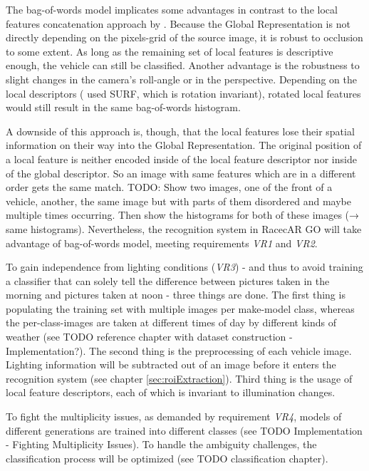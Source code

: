 The bag-of-words model implicates some advantages in contrast to the local features concatenation approach by \citeauthor{petrovic2004analysis}. Because the Global Representation is not directly depending on the pixels-grid of the source image, it is robust to occlusion to some extent. As long as the remaining set of local features is descriptive enough, the vehicle can still be classified. Another advantage is the robustness to slight changes in the camera's roll-angle or in the perspective. Depending on the local descriptors (\citeauthor{siddiqui2015robust} used SURF, which is rotation invariant), rotated local features would still result in the same bag-of-words histogram.

A downside of this approach is, though, that the local features lose their spatial information on their way into the Global Representation. The original position of a local feature is neither encoded inside of the local feature descriptor nor inside of the global descriptor. So an image with same features which are in a different order gets the same match. TODO: Show two images, one of the front of a vehicle, another, the same image but with parts of them disordered and maybe multiple times occurring. Then show the histograms for both of these images (→ same histograms). Nevertheless, the recognition system in RacecAR GO will take advantage of bag-of-words model, meeting requirements \emph{VR1} and \emph{VR2}.

To gain independence from lighting conditions (\emph{VR3}) - and thus to avoid training a classifier that can solely tell the difference between pictures taken in the morning and pictures taken at noon - three things are done. The first thing is populating the training set with multiple images per make-model class, whereas the per-class-images are taken at different times of day by different kinds of weather (see TODO reference chapter with dataset construction - Implementation?). The second thing is the preprocessing of each vehicle image. Lighting information will be subtracted out of an image before it enters the recognition system (see chapter \ref{sec:roiExtraction}). Third thing is the usage of local feature descriptors, each of which is invariant to illumination changes.

To fight the multiplicity issues, as demanded by requirement \emph{VR4}, models of different generations are trained into different classes (see TODO Implementation - Fighting Multiplicity Issues). To handle the ambiguity challenges, the classification process will be optimized (see TODO classification chapter).

